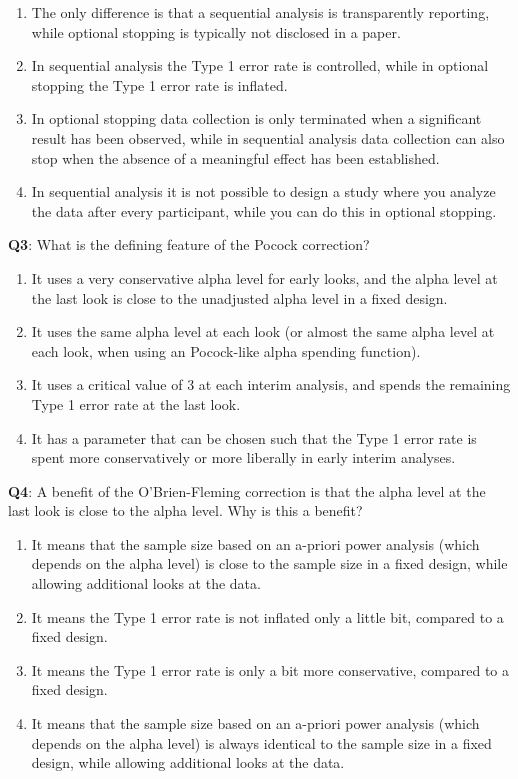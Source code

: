 \documentclass[
  oneside]{book}
\providecommand{\tightlist}{%
  \setlength{\itemsep}{0pt}\setlength{\parskip}{0pt}}
\begin{document}
\begin{enumerate}
\def\labelenumi{\Alph{enumi})}
\tightlist
\item
  The only difference is that a sequential analysis is transparently reporting, while optional stopping is typically not disclosed in a paper.
\item
  In sequential analysis the Type 1 error rate is controlled, while in optional stopping the Type 1 error rate is inflated.
\item
  In optional stopping data collection is only terminated when a significant result has been observed, while in sequential analysis data collection can also stop when the absence of a meaningful effect has been established.
\item
  In sequential analysis it is not possible to design a study where you analyze the data after every participant, while you can do this in optional stopping.
\end{enumerate}

\textbf{Q3}: What is the defining feature of the Pocock correction?

\begin{enumerate}
\def\labelenumi{\Alph{enumi})}
\tightlist
\item
  It uses a very conservative alpha level for early looks, and the alpha level at the last look is close to the unadjusted alpha level in a fixed design.
\item
  It uses the same alpha level at each look (or almost the same alpha level at each look, when using an Pocock-like alpha spending function).
\item
  It uses a critical value of 3 at each interim analysis, and spends the remaining Type 1 error rate at the last look.
\item
  It has a parameter that can be chosen such that the Type 1 error rate is spent more conservatively or more liberally in early interim analyses.
\end{enumerate}

\textbf{Q4}: A benefit of the O'Brien-Fleming correction is that the alpha level at the last look is close to the alpha level. Why is this a benefit?

\begin{enumerate}
\def\labelenumi{\Alph{enumi})}
\tightlist
\item
  It means that the sample size based on an a-priori power analysis (which depends on the alpha level) is close to the sample size in a fixed design, while allowing additional looks at the data.
\item
  It means the Type 1 error rate is not inflated only a little bit, compared to a fixed design.
\item
  It means the Type 1 error rate is only a bit more conservative, compared to a fixed design.
\item
  It means that the sample size based on an a-priori power analysis (which depends on the alpha level) is always identical to the sample size in a fixed design, while allowing additional looks at the data.
\end{enumerate}
\end{document}
